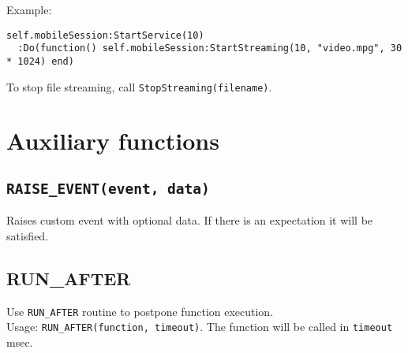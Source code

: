 \documentclass{article}
\begin{document}
Example:
\begin{lstlisting}
self.mobileSession:StartService(10)
  :Do(function() self.mobileSession:StartStreaming(10, "video.mpg", 30 * 1024) end)
\end{lstlisting}
To stop file streaming, call {\tt StopStreaming(filename)}.
\section{Auxiliary functions}
\subsection{\tt RAISE\_EVENT(event, data)}
Raises custom event with optional data. If there is an expectation it will be satisfied.
\subsection{RUN\_AFTER}
Use {\tt RUN\_AFTER} routine to postpone function execution.\\
Usage: {\tt RUN\_AFTER(function, timeout)}.
The function will be called in {\tt timeout} msec.
\end{document}
